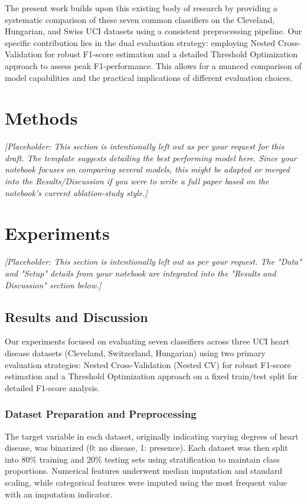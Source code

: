 \documentclass{article}
\begin{document}
The present work builds upon this existing body of research by providing a systematic comparison of these seven common classifiers on the Cleveland, Hungarian, and Swiss UCI datasets using a consistent preprocessing pipeline. Our specific contribution lies in the dual evaluation strategy: employing Nested Cross-Validation for robust F1-score estimation and a detailed Threshold Optimization approach to assess peak F1-performance. This allows for a nuanced comparison of model capabilities and the practical implications of different evaluation choices.


\section{Methods}
\textit{[Placeholder: This section is intentionally left out as per your request for this draft. The template suggests detailing the best performing model here. Since your notebook focuses on comparing several models, this might be adapted or merged into the Results/Discussion if you were to write a full paper based on the notebook's current ablation-study style.]}

\section{Experiments}
\textit{[Placeholder: This section is intentionally left out as per your request. The "Data" and "Setup" details from your notebook are integrated into the "Results and Discussion" section below.]}

\subsection{Results and Discussion}
Our experiments focused on evaluating seven classifiers across three UCI heart disease datasets (Cleveland, Switzerland, Hungarian) using two primary evaluation strategies: Nested Cross-Validation (Nested CV) for robust F1-score estimation and a Threshold Optimization approach on a fixed train/test split for detailed F1-score analysis.

\subsubsection{Dataset Preparation and Preprocessing}
The target variable in each dataset, originally indicating varying degrees of heart disease, was binarized (0: no disease, 1: presence). Each dataset was then split into 80\% training and 20\% testing sets using stratification to maintain class proportions. Numerical features underwent median imputation and standard scaling, while categorical features were imputed using the most frequent value with an imputation indicator.
\end{document}
